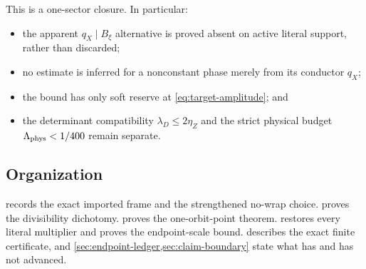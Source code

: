 This is a one-sector closure.  In particular:
\begin{itemize}[leftmargin=2em]
\item the apparent \(q_X\mid B_\xi\) alternative is proved absent on
  active literal support, rather than discarded;
\item no estimate is inferred for a nonconstant phase merely from
  its conductor \(q_X\);
\item the bound has only soft reserve at
  \eqref{eq:target-amplitude}; and
\item the determinant compatibility
  \(\lambda_D\le2\eta_Z\) and the strict physical budget
  \(\Lambda_{\rm phys}<1/400\) remain separate.
\end{itemize}

\subsection{Organization}

 records the exact imported frame and the
strengthened no-wrap choice.   proves the
divisibility dichotomy.   proves the
one-orbit-point theorem.   restores every
literal multiplier and proves the endpoint-scale bound.
 describes the exact finite certificate, and
\cref{sec:endpoint-ledger,sec:claim-boundary} state what has and has
not advanced.
